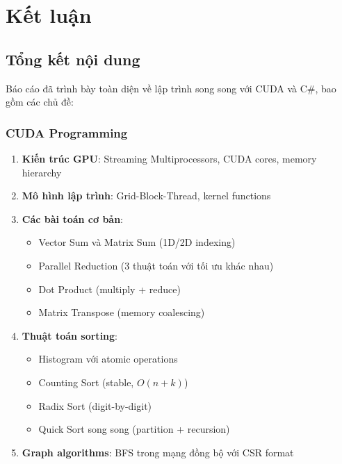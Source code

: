 \chapter{Kết luận}
\label{chap:conclusion}

\section{Tổng kết nội dung}

Báo cáo đã trình bày toàn diện về lập trình song song với CUDA và C\#, bao gồm các chủ đề:

\subsection{CUDA Programming}

\begin{enumerate}
    \item \textbf{Kiến trúc GPU}: Streaming Multiprocessors, CUDA cores, memory hierarchy
    \item \textbf{Mô hình lập trình}: Grid-Block-Thread, kernel functions
    \item \textbf{Các bài toán cơ bản}:
    \begin{itemize}
        \item Vector Sum và Matrix Sum (1D/2D indexing)
        \item Parallel Reduction (3 thuật toán với tối ưu khác nhau)
        \item Dot Product (multiply + reduce)
        \item Matrix Transpose (memory coalescing)
    \end{itemize}
    \item \textbf{Thuật toán sorting}:
    \begin{itemize}
        \item Histogram với atomic operations
        \item Counting Sort (stable, $O(n+k)$)
        \item Radix Sort (digit-by-digit)
        \item Quick Sort song song (partition + recursion)
    \end{itemize}
    \item \textbf{Graph algorithms}: BFS trong mạng đồng bộ với CSR format
\end{enumerate}

